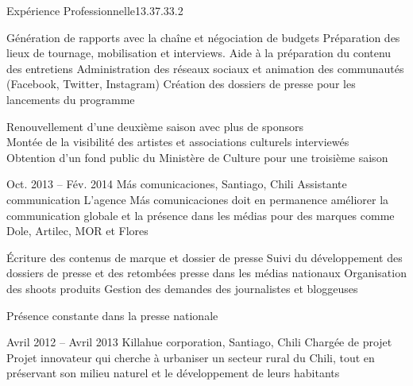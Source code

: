 \documentclass[30pt, french]{tccv}
\begin{document}
\begin{upshape}
\begin{flat_frame}{Expérience Professionnelle}{13.3}{7.3}{3.2}{}
\begin{eventlist}
    \setlength{\parskip}{-10pt}
    \begin{itemize}
      \setlength\itemsep{-3pt} 
      \cvitem[\checkmark] Génération de rapports avec la chaîne et négociation de budgets                       
      \cvitem[\checkmark] Préparation des lieux de tournage, mobilisation et interviews. Aide à la préparation du contenu des entretiens 
      \cvitem[\checkmark] Administration des réseaux sociaux et animation des communautés (Facebook, Twitter, Instagram)                 
      \cvitem[\checkmark] Création des dossiers de presse pour les lancements du programme                                             
    \end{itemize}     
 Renouvellement d'une deuxième saison avec plus de sponsors \\
\mission{}	     Montée de la visibilité des artistes et associations culturels interviewés \\
\mission{}           Obtention d’un fond public du Ministère de Culture pour une troisième saison  \\




\setlength{\parskip}{0pt}    
\item{Oct. 2013 -- Fév. 2014 }     
  {Más comunicaciones, Santiago, Chili}     
  {Assistante communication}
     \fontsize{9pt}{1em}\color{text}\bodyfontlight\upshape\selectfont
%    
 L’agence Más comunicaciones doit en permanence améliorer la communication globale et la présence dans les médias
pour des marques comme Dole, Artilec, MOR et Flores\\

\setlength{\parskip}{-10pt}
\begin{itemize}
      \setlength\itemsep{-3pt} 
      \cvitem[\checkmark]  Écriture des contenus de marque et dossier de presse                                        
      \cvitem[\checkmark]  Suivi du développement des dossiers de presse et des retombées presse dans les médias nationaux                                             
      \cvitem[\checkmark]  Organisation des shoots produits 
      \cvitem[\checkmark]  Gestion des demandes des journalistes et bloggeuses 

\end{itemize}       
 Présence constante dans la presse nationale
\vspace{0.5cm}




\setlength{\parskip}{0pt}
\item{Avril 2012 -- Avril 2013 }     
  {Killahue corporation, Santiago, Chili}     
  {Chargée de projet}
\fontsize{9pt}{1em}\color{text}\bodyfontlight\upshape\selectfont
%
 Projet innovateur qui cherche à urbaniser un secteur rural du Chili, tout en préservant son milieu naturel et le développement de leurs habitants \\
     

\end{eventlist}
\end{flat_frame}
\end{upshape}
\end{document}
